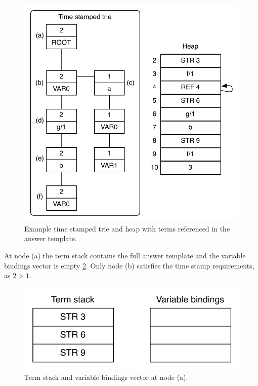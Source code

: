 \begin{figure}[H]
  \centering
    \includegraphics[scale=0.6]{collect_functor.pdf}
  \caption{Example time stamped trie and heap with terms referenced in the answer template.}
  \label{fig:collect_functor}
\end{figure}

At node (a) the term stack contains the full answer template and the variable bindings vector
is empty \ref{fig:collect_functor1}. Only node (b) satisfies the time stamp requirements,
as $2 > 1$.

\begin{figure}[H]
  \centering
    \includegraphics[scale=0.6]{collect_functor1.pdf}
  \caption{Term stack and variable bindings vector at node (a).}
  \label{fig:collect_functor1}
\end{figure}

